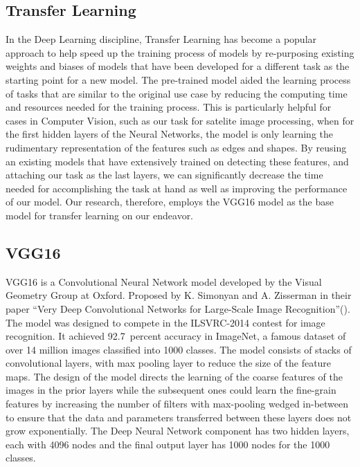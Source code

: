 \documentclass[solid,math,chem,code,plot,gloss]{bmc}
\begin{document}
\subsection{Transfer Learning}

In the Deep Learning discipline, Transfer Learning has become a popular approach to help speed up the training process of models by re-purposing existing weights and biases of models that have been developed for a different task as the starting point for a new model. The pre-trained model aided the learning process of tasks that are similar to the original use case by reducing the computing time and resources needed for the training process. This is particularly helpful for cases in Computer Vision, such as our task for satelite image processing, when for the first hidden layers of the Neural Networks, the model is only learning the rudimentary representation of the features such as edges and shapes. By reusing an existing models that have extensively trained on detecting these features, and attaching our task as the last layers, we can significantly decrease the time needed for accomplishing the task at hand as well as improving the performance of our model. Our research, therefore, employs the VGG16 model as the base model for transfer learning on our endeavor. 

\subsection{VGG16}

VGG16 is a Convolutional Neural Network model developed by the Visual Geometry Group at Oxford. Proposed by K. Simonyan and A. Zisserman in their paper “Very Deep Convolutional Networks for Large-Scale Image Recognition”(\cite{vgg16}). The model was designed to compete in the ILSVRC-2014 contest for image recognition. It achieved 92.7\ percent accuracy in ImageNet, a famous dataset of over 14 million images classified into 1000 classes. The model consists of stacks of convolutional layers, with max pooling layer to reduce the size of the feature maps. The design of the model directs the learning of the coarse features of the images in the prior layers while the subsequent ones could learn the fine-grain features by increasing the number of filters with max-pooling wedged in-between to ensure that the data and parameters transferred between these layers does not grow exponentially. The Deep Neural Network component has two hidden layers, each with 4096 nodes and the final output layer has 1000 nodes for the 1000 classes. 
\end{document}
